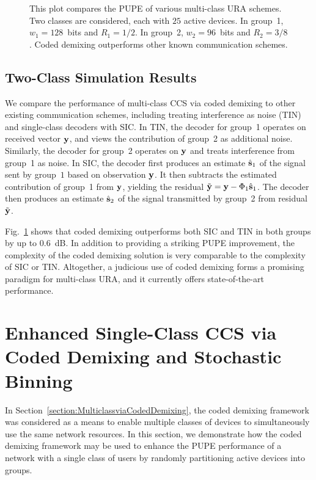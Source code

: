 \documentclass[journal]{IEEEtran}
\begin{document}
\begin{figure}[t]
    \centering
    
    \vspace{-3mm}
    \caption{
    This plot compares the PUPE of various multi-class URA schemes.
    Two classes are considered, each with $25$ active devices.
    In group~1, $w_1 = 128$~bits and $R_1 = 1/2$.  
    In group~2, $w_2 = 96$~bits and $R_2 = 3/8$.
    Coded demixing outperforms other known communication schemes.}
    \label{fig:MultiClassResults}
\end{figure}

\subsection{Two-Class Simulation Results}

We compare the performance of multi-class CCS via coded demixing to other existing communication schemes, including treating interference as noise (TIN) and single-class decoders with SIC. 
In TIN, the decoder for group~1 operates on received vector $\mathbf{y}$, and views the contribution of group~2 as additional noise.
Similarly, the decoder for group~2 operates on $\mathbf{y}$ and treats interference from group~1 as noise. 
In SIC, the decoder first produces an estimate $\hat{\mathbf{s}}_1$ of the signal sent by group~$1$ based on observation $\mathbf{y}$.
It then subtracts the estimated contribution of group~1 from $\mathbf{y}$, yielding the residual $\Tilde{\mathbf{y}} = \mathbf{y} - \Phi_1\hat{\mathbf{s}}_1$.
The decoder then produces an estimate $\hat{\mathbf{s}}_2$ of the signal transmitted by group~2 from residual $\tilde{\mathbf{y}}$. 

Fig.~\ref{fig:MultiClassResults} shows that coded demixing outperforms both SIC and TIN in both groups by up to $0.6$~dB.
In addition to providing a striking PUPE improvement, the complexity of the coded demixing solution is very comparable to the complexity of SIC or TIN.
Altogether, a judicious use of coded demixing forms a promising paradigm for multi-class URA, and it currently offers state-of-the-art performance.

\section{Enhanced Single-Class CCS via Coded Demixing and Stochastic Binning}
\label{section:StochasticBinningandCodedDemixing}

In Section~\ref{section:MulticlassviaCodedDemixing}, the coded demixing framework was considered as a means to enable multiple classes of devices to simultaneously use the same network resources. 
In this section, we demonstrate how the coded demixing framework may be used to enhance the PUPE performance of a network with a single class of users by randomly partitioning active devices into groups.
\end{document}
